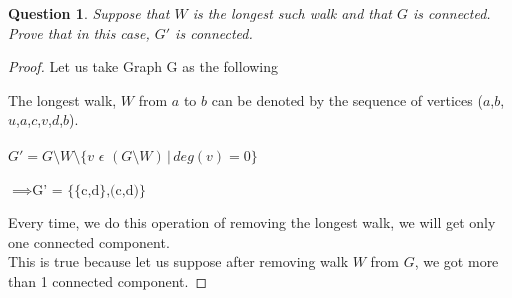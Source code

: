 \documentclass{article}
\newtheorem{question}{Question}
\begin{document}
\begin{question}
    Suppose that $W$ is the longest such walk and that $G$ is connected.  Prove that in this case, $G'$ is connected.
\end{question}
\begin{proof}
    Let us take Graph G as the following\\
\begin{center}

\end{center}
    The longest walk, $W$ from $a$ to $b$ can be denoted by the sequence of vertices ($a$,$b$,$u$,$a$,$c$,$v$,$d$,$b$).\\
    \\
    $G' = G\setminus W\setminus \{v \hspace{4pt} \epsilon \hspace{4pt} (G\setminus W)\hspace{2pt} |\hspace{2pt} deg(v) = 0\}$\\
    \\
    $\implies \text{G' = \{\{c,d\},(c,d)\}}$
\begin{center}

\end{center}

    Every time, we do this operation of removing the longest walk, we will get only one connected component.\\
    This is true because let us suppose after removing walk $W$ from $G$, we got more than 1 connected component.


\end{proof}
\end{document}
